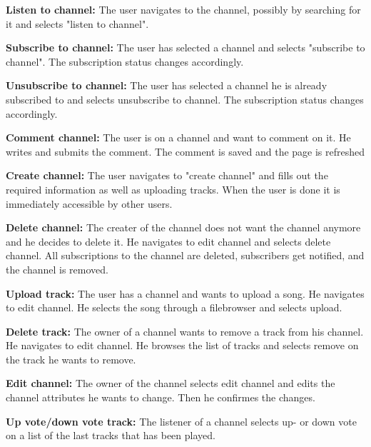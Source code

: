 \documentclass[a4paper,11pt,report]{article}
\begin{document}
\textbf{Listen to channel:}
The user navigates to the channel, possibly by searching for it and selects "listen to channel".

\textbf{Subscribe to channel:}
The user has selected a channel and selects "subscribe to channel". The subscription status changes accordingly.

\textbf{Unsubscribe to channel:}
The user has selected a channel he is already subscribed to and selects unsubscribe to channel. The subscription status changes accordingly.

\textbf{Comment channel:}
The user is on a channel and want to comment on it. He writes and submits the comment. The comment is saved and the page is refreshed

\textbf{Create channel:}
The user navigates to "create channel" and fills out the required information as well as uploading tracks. When the user is done it is immediately accessible by other users.

\textbf{Delete channel:}
The creater of the channel does not want the channel anymore and he decides to delete it. He navigates to edit channel and selects delete channel. All subscriptions to the channel are deleted, subscribers get notified, and the channel is removed.

\textbf{Upload track:}
The user has a channel and wants to upload a song. He navigates to edit channel. He selects the song through a filebrowser and selects upload.

\textbf{Delete track:}
The owner of a channel wants to remove a track from his channel. He navigates to edit channel. He browses the list of tracks and selects remove on the track he wants to remove.

\textbf{Edit channel:}
The owner of the channel selects edit channel and edits the channel attributes he wants to change. Then he confirmes the changes.

\textbf{Up vote/down vote track:}
The listener of a channel selects up- or down vote on a list of the last tracks that has been played.
\end{document}
